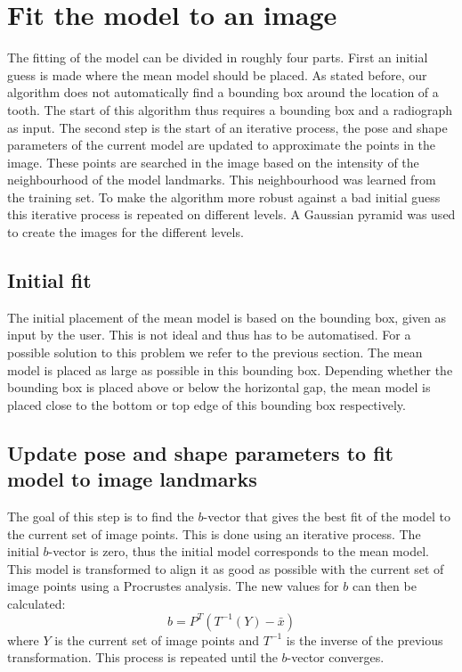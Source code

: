 \documentclass[a4paper,10pt]{article}
\begin{document}
\section{Fit the model to an image}
The fitting of the model can be divided in roughly four parts. First an initial guess is made where the mean model should be placed. As stated before, our algorithm does not automatically find a bounding box around the location of a tooth. The start of this algorithm thus requires a bounding box and a radiograph as input. The second step is the start of an iterative process, the pose and shape parameters of the current model are updated to approximate the points in the image. These points are searched in the image based on the intensity of the neighbourhood of the model landmarks. This neighbourhood was learned from the training set. To make the algorithm more robust against a bad initial guess this iterative process is repeated on different levels. A Gaussian pyramid was used to create the images for the different levels.
\subsection{Initial fit}
The initial placement of the mean model is based on the bounding box, given as input by the user. This is not ideal and thus has to be automatised. For a possible solution to this problem we refer to the previous section. The mean model is placed as large as possible in this bounding box. Depending whether the bounding box is placed above or below the horizontal gap, the mean model is placed close to the bottom or top edge of this bounding box respectively.

\subsection{Update pose and shape parameters to fit model to image landmarks}
The goal of this step is to find the $b$-vector that gives the best fit of the model to the current set of image points. This is done using an iterative process. The initial $b$-vector is zero, thus the initial model corresponds to the mean model. This model is transformed to align it as good as possible with the current set of image points using a Procrustes analysis. The new values for $b$ can then be calculated:
\begin{equation*}
	b = P^T(T^{-1}(Y)-\bar{x})
\end{equation*}
where $Y$ is the current set of image points and $T^{-1}$ is the inverse of the previous transformation. This process is repeated until the $b$-vector converges.
\end{document}
